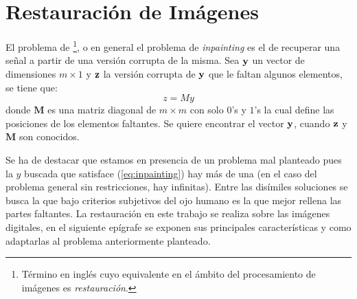 \chapter{Restauraci\'on de Imágenes}\label{chapter:ImIp} %

\begin{definition}\label{def:inpainting}
	El problema de \II\footnote{T\'ermino en ingl\'es cuyo equivalente en el \'ambito del procesamiento de im\'agenes es \textit{restauraci\'on}.}, o en general el problema de \textit{inpainting} es el de recuperar una señal a partir de una versi\'on corrupta de la misma. Sea $\mathbf{y}$ un vector de dimensiones $m \times 1$ y $\mathbf{z}$ la versi\'on corrupta de $\mathbf{y}$ que le faltan algunos elementos, se tiene que:
	\begin{equation}
		z = My
		\label{eq:inpainting}
	\end{equation}
	donde $\mathbf{M}$ es una matriz diagonal de $m \times m$ con solo $0$'s y $1$'s la cual define las posiciones de los elementos faltantes. Se quiere encontrar el vector $\mathbf{y}$, cuando $\mathbf{z}$ y  $\mathbf{M}$ son conocidos. 
\end{definition}

Se ha de destacar que estamos en presencia de un problema mal planteado pues la $y$ buscada que satisface (\ref{eq:inpainting}) hay m\'as de una (en el caso del problema general sin restricciones, hay infinitas). Entre las dis\'imiles soluciones se busca la que bajo criterios subjetivos del ojo humano es la que mejor rellena las partes faltantes. La restauraci\'on en este trabajo se realiza sobre las im\'agenes digitales, en el siguiente ep\'igrafe se exponen sus principales características y como adaptarlas al problema anteriormente planteado. 

